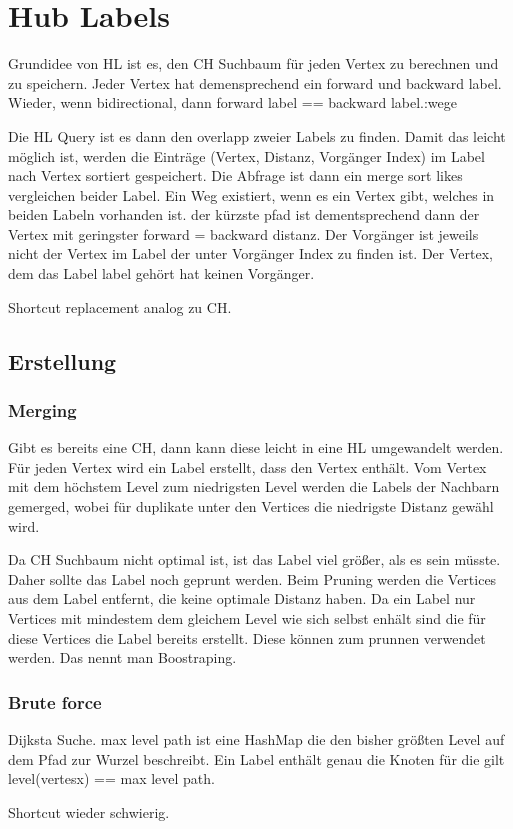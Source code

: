 \chapter{Hub Labels}\label{chapter:hl}

Grundidee von HL ist es, den CH Suchbaum für jeden Vertex zu berechnen und zu speichern.
Jeder Vertex hat demensprechend ein forward und backward label.
Wieder, wenn bidirectional, dann forward label == backward label.:wege

Die HL Query ist es dann den overlapp zweier Labels zu finden.
Damit das leicht möglich ist, werden die Einträge (Vertex, Distanz, Vorgänger Index) im Label nach Vertex sortiert gespeichert.
Die Abfrage ist dann ein merge sort likes vergleichen beider Label. Ein Weg existiert, wenn es ein Vertex gibt, welches in beiden Labeln vorhanden ist.
der kürzste pfad ist dementsprechend dann der Vertex mit geringster forward = backward distanz.
Der Vorgänger ist jeweils nicht der Vertex im Label der unter Vorgänger Index zu finden ist. Der Vertex, dem das Label label gehört hat keinen Vorgänger.

Shortcut replacement analog zu CH.

\section{Erstellung}

\subsection{Merging}
Gibt es bereits eine CH, dann kann diese leicht in eine HL umgewandelt werden.
Für jeden Vertex wird ein Label erstellt, dass den Vertex enthält.
Vom Vertex mit dem höchstem Level zum niedrigsten Level werden die Labels der Nachbarn gemerged, wobei für duplikate unter den Vertices die niedrigste Distanz gewähl wird.

Da CH Suchbaum nicht optimal ist, ist das Label viel größer, als es sein müsste. Daher sollte das Label noch geprunt werden.
Beim Pruning werden die Vertices aus dem Label entfernt, die keine optimale Distanz haben.
Da ein Label nur Vertices mit mindestem dem gleichem Level wie sich selbst enhält sind die für diese Vertices die Label bereits erstellt.
Diese können zum prunnen verwendet werden.
Das nennt man Boostraping.

\subsection{Brute force}
Dijksta Suche.
max level path ist eine HashMap die den bisher größten Level auf dem Pfad zur Wurzel beschreibt.
Ein Label enthält genau die Knoten für die gilt level(vertesx) == max level path.

Shortcut wieder schwierig.
